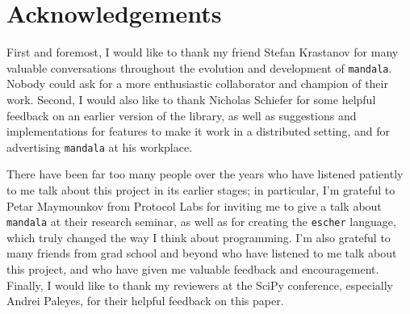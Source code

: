 \section*{Acknowledgements}

First and foremost, I would like to thank my friend Stefan Krastanov for many
valuable conversations throughout the evolution and development of
\texttt{mandala}. Nobody could ask for a more enthusiastic collaborator and
champion of their work. Second, I would also like to thank Nicholas Schiefer for
some helpful feedback on an earlier version of the library, as well as
suggestions and implementations for features to make it work in a distributed
setting, and for advertising \texttt{mandala} at his workplace.

There have been far too many people over the years who have listened patiently
to me talk about this project in its earlier stages; in particular, I'm grateful
to Petar Maymounkov from Protocol Labs for inviting me to give a talk about
\texttt{mandala} at their research seminar, as well as for creating the
\texttt{escher} language, which truly changed the way I think about programming.
I'm also grateful to many friends from grad school and beyond who have listened
to me talk about this project, and who have given me valuable feedback and
encouragement. Finally, I would like to thank my reviewers at the SciPy
conference, especially Andrei Paleyes, for their helpful feedback on this paper.
